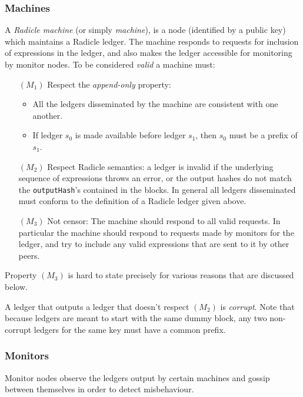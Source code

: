 \documentclass[a4paper, oneside, 10pt]{amsart}
\begin{document}
\subsubsection{Machines}

A \emph{Radicle machine} (or simply \emph{machine}), is a node (identified by a
public key) which maintains a Radicle ledger. The machine responds to requests
for inclusion of expressions in the ledger, and also makes the ledger accessible
for monitoring by monitor nodes. To be considered \emph{valid} a machine must:
\begin{itemize}
\item[$(M_1)$]
  Respect the \emph{append-only} property:
  \begin{itemize}
  \item
    All the ledgers disseminated by the machine are consistent with one another.
  \item
    If ledger $s_0$ is made available before ledger $s_1$, then $s_0$ must be a
    prefix of $s_1$.
  \end{itemize}
\item[$(M_2)$] Respect Radicle semantics: a ledger is invalid if the underlying
  sequence of expressions throws an error, or the output hashes do not match the
  \texttt{outputHash}'s contained in the blocks. In general all ledgers
  disseminated must conform to the definition of a Radicle ledger given above.
\item[$(M_3)$] Not censor: The machine should respond to all valid requests. In
  particular the machine should respond to requests made by monitors for the
  ledger, and try to include any valid expressions that are sent to it by other
  peers.
\end{itemize}

Property $(M_3)$ is hard to state precisely for various reasons that are
discussed below.

A ledger that outputs a ledger that doesn't respect $(M_2)$ is
\emph{corrupt}. Note that because ledgers are meant to start with the same dummy
block, any two non-corrupt ledgers for the same key must have a common prefix.

\subsubsection{Monitors}\label{monitors}

Monitor nodes observe the ledgers output by certain machines and gossip between
themselves in order to detect misbehaviour.
\end{document}
